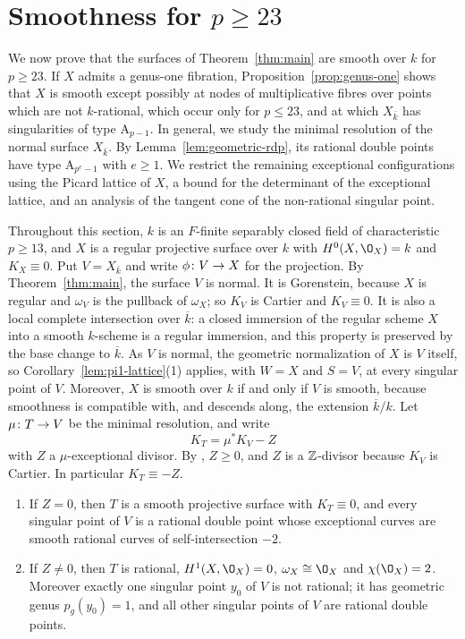\section{Smoothness for \texorpdfstring{$p\geq 23$}{p >= 23}}\label{sec:smooth}
We now prove that the surfaces of Theorem~\ref{thm:main} are smooth over $k$ for $p\geq 23$.
If $X$ admits a genus-one fibration, Proposition~\ref{prop:genus-one} shows that $X$ is smooth except possibly at nodes of multiplicative fibres over points which are not $k$-rational, which occur only for $p\leq 23$, and at which $X_{\bar k}$ has singularities of type $\mathrm A_{p-1}$.
In general, we study the minimal resolution of the normal surface $X_{\bar k}$.
By Lemma~\ref{lem:geometric-rdp}, its rational double points have type $\mathrm A_{p^e-1}$ with $e\geq 1$.
We restrict the remaining exceptional configurations using the Picard lattice of $X$, a bound for the determinant of the exceptional lattice, and an analysis of the tangent cone of the non-rational singular point.

Throughout this section, $k$ is an $F$-finite separably closed field of characteristic $p\geq 13$, and $X$ is a regular projective surface over $k$ with $H^0(X,\O_X) = k$ and $K_X\equiv 0$.
Put $V = X_{\bar k}$ and write $\phi\colon V\to X$ for the projection.
By Theorem~\ref{thm:main}, the surface $V$ is normal.
It is Gorenstein, because $X$ is regular and $\omega_V$ is the pullback of $\omega_X$; so $K_V$ is Cartier and $K_V\equiv 0$.
It is also a local complete intersection over $\overline k$: a closed immersion of the regular scheme $X$ into a smooth $k$-scheme is a regular immersion, and this property is preserved by the base change to $\overline k$.
As $V$ is normal, the geometric normalization of $X$ is $V$ itself, so Corollary~\ref{lem:pi1-lattice}(1) applies, with $W = X$ and $S = V$, at every singular point of $V$.
Moreover, $X$ is smooth over $k$ if and only if $V$ is smooth, because smoothness is compatible with, and descends along, the extension $\overline k/k$.
Let $\mu\colon T\to V$ be the minimal resolution, and write
\[
  K_T = \mu^*K_V-Z
\]
with $Z$ a $\mu$-exceptional divisor.
By \cite[Theorem~10.5 and Claim~10.3.5]{Kol13}, $Z\geq 0$, and $Z$ is a $\mathbb{Z}$-divisor because $K_V$ is Cartier.
In particular $K_T\equiv -Z$.

\begin{lemma}\label{lem:smooth-structure}
\begin{enumerate}
\item If $Z = 0$, then $T$ is a smooth projective surface with $K_T\equiv 0$, and every singular point of $V$ is a rational double point whose exceptional curves are smooth rational curves of self-intersection $-2$.
\item If $Z\neq 0$, then $T$ is rational, $H^1(X,\O_X) = 0$, $\omega_X\cong\O_X$ and $\chi(\O_X) = 2$.
  Moreover exactly one singular point $y_0$ of $V$ is not rational; it has geometric genus $p_g(y_0) = 1$, and all other singular points of $V$ are rational double points.
\end{enumerate}
\end{lemma}

